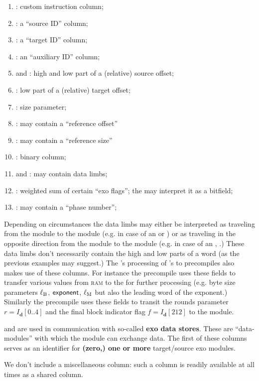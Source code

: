 \begin{enumerate}[resume]
	\item \miscMmuInst{}:
		custom \mmuMod{} instruction column;
	\item \miscMmuSrcId{}:
		a ``source ID'' column;
	\item \miscMmuTgtId{}:
		a ``target ID'' column;
	\item \miscMmuAuxId{}:
		an ``auxiliary ID'' column;
	\item \miscMmuSrcOffsetHi{} and \miscMmuSrcOffsetLo{}:
		high and low part of a (relative) source offset;
	\item \miscMmuTgtOffsetLo{}:
		low part of a (relative) target offset;
	\item \miscMmuSize{}:
		size parameter;
	\item \miscMmuRefOffset{}:
		may contain a ``reference offset''
	\item \miscMmuRefSize{}:
		may contain a ``reference size''
	\item \miscMmuSuccessBit{}:
		binary column;
	\item \miscMmuLimbOne{} and \miscMmuLimbTwo{}:
		may contain data limbs;
	\item \miscMmuExoSum{}:
		weighted sum of certain ``exo flags'';
		the \mmioMod{} may interpret it as a bitfield;
	\item \miscMmuPhase{}:
		may contain a ``phase number'';
\end{enumerate}
Depending on circumstances the data limbs may either be interpreted
as traveling from the \hubMod{} module to the \mmuMod{} module (e.g. in case of an  or ) or
as traveling in the opposite direction from the \mmuMod{} module to the  \hubMod{} module (e.g. in case of an , .)
These data limbs don't necessarily contain the high and low parts of a \evm{} word (as the previous examples may suggest.)
The \hubMod{}'s processing of 's to precompiles also makes use of these columns. 
For instance the  precompile uses these fields to transfer various values from \textsc{ram} to the \hubMod{} for further processing
(e.g. byte size parameters $\ell_\text{B}$, $\textsf{exponent}$, $\ell_\text{M}$ but also the leading word of the exponent.)
Similarly the  precompile uses these fields to transit
the rounds parameter $r = I_\textbf{d}[0\text{..}4]$ and
the final block indicator flag $f = I_\textbf{d}[212]$
to the \hubMod{} module.

\miscMmuExoSum{} and \miscMmuPhase{} are used in communication with so-called \textbf{exo data stores}.
These are ``data-modules'' with which the \mmioMod{} module can exchange data.
The first of these columns serves as an identifier for \textbf{(zero,) one or more} target/source exo modules. 

\saNote{} We don't include a miscellaneous \mmuStamp{} column: such a column is readily available at all times as a shared column.

